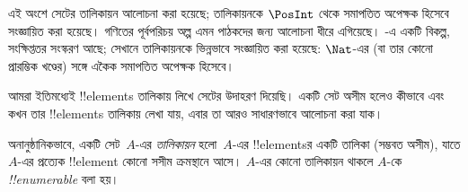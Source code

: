 \documentclass[../../../include/open-logic-section]{subfiles}
\begin{document}


\begin{editorial}
  এই অংশে সেটের তালিকায়ন আলোচনা করা হয়েছে; তালিকায়নকে $\PosInt$ থেকে সমাপতিত অপেক্ষক হিসেবে সংজ্ঞায়িত করা হয়েছে। গণিতের পূর্বপরিচয় অল্প এমন পাঠকদের জন্য আলোচনা ধীরে এগিয়েছে। -এ একটি বিকল্প, সংক্ষিপ্ততর সংস্করণ আছে; সেখানে তালিকায়নকে ভিন্নভাবে সংজ্ঞায়িত করা হয়েছে: $\Nat$-এর (বা তার কোনো প্রারম্ভিক খণ্ডের) সঙ্গে একৈক সমাপতিত অপেক্ষক হিসেবে।
\end{editorial}

\begin{explain}
আমরা ইতিমধ্যেই !!{element}s তালিকায় লিখে সেটের উদাহরণ দিয়েছি। একটি সেট অসীম হলেও কীভাবে এবং কখন তার !!{element}s তালিকায় লেখা যায়, এবার তা আরও সাধারণভাবে আলোচনা করা যাক।
\end{explain}

\begin{defn}[তালিকায়ন, অনানুষ্ঠানিকভাবে]
অনানুষ্ঠানিকভাবে, একটি সেট~$A$-এর \emph{তালিকায়ন} হলো~$A$-এর !!{element}sর একটি তালিকা (সম্ভবত অসীম), যাতে $A$-এর প্রত্যেক !!{element} কোনো সসীম ক্রমস্থানে আসে। $A$-এর কোনো তালিকায়ন থাকলে $A$-কে \emph{!!{enumerable}} বলা হয়।
\end{defn}
\end{document}
